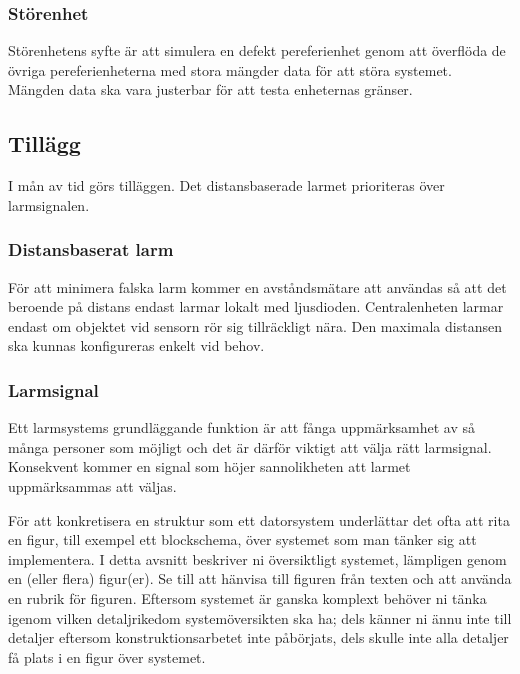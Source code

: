 \documentclass[a4paper]{article}
\begin{document}
\subsubsection{Störenhet}
Störenhetens syfte är att simulera en defekt pereferienhet genom att överflöda de övriga pereferienheterna med stora mängder data för att störa systemet. Mängden data ska vara justerbar för att testa enheternas gränser.

\subsection{Tillägg}
\label{sec:Tillägg}
I mån av tid görs tilläggen. Det distansbaserade larmet prioriteras över larmsignalen.
\subsubsection{Distansbaserat larm}

För att minimera falska larm kommer en avståndsmätare att användas så att det beroende på distans endast larmar lokalt med ljusdioden. Centralenheten larmar endast om objektet vid sensorn rör sig tillräckligt nära. Den maximala distansen ska kunnas konfigureras enkelt vid behov.

\subsubsection{Larmsignal}
Ett larmsystems grundläggande funktion är att fånga uppmärksamhet av så många personer som möjligt och det är därför viktigt att välja rätt larmsignal. Konsekvent kommer en signal som höjer sannolikheten att larmet uppmärksammas att väljas.

\iffalse
För att konkretisera en struktur som ett datorsystem underlättar det
ofta att rita en figur, till exempel ett blockschema, över systemet som
man tänker sig att implementera. I detta avsnitt beskriver ni
översiktligt systemet, lämpligen genom en (eller flera) figur(er). Se
till att hänvisa till figuren från texten och att använda en rubrik för
figuren. Eftersom systemet är ganska komplext behöver ni tänka igenom
vilken detaljrikedom systemöversikten ska ha; dels känner ni ännu inte
till detaljer eftersom konstruktionsarbetet inte påbörjats, dels skulle
inte alla detaljer få plats i en figur över systemet.
\end{document}
